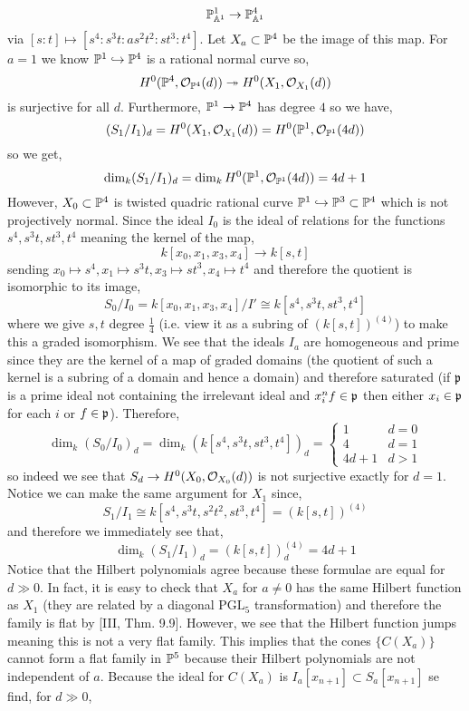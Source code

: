 \documentclass[12pt]{article}
\begin{document}
\begin{enumerate}
\[ \P^1_{\A^1} \to \P^4_{\A^1} \]
via $[s:t] \mapsto [s^4 : s^3 t : a s^2 t^2 : s t^3 : t^4]$. Let $X_a \subset \P^4$ be the image of this map. For $a = 1$ we know $\P^1 \embed \P^4$ is a rational normal curve so,
\[ H^0(\P^4, \struct{\P^4}(d)) \onto H^0(X_1, \struct{X_1}(d)) \]
is surjective for all $d$. Furthermore, $\P^1 \to \P^4$ has degree $4$ so we have,
\[ (S_1/I_1)_d =  H^0(X_1, \struct{X_1}(d)) = H^0(\P^1, \struct{\P^1}(4d)) \]
so we get,
\[ \dim_{k}(S_1/I_1)_d = \dim_{k} H^0(\P^1, \struct{\P^1}(4d)) = 4d + 1 \]
However, $X_0 \subset \P^4$ is twisted quadric rational curve $\P^1 \embed \P^3 \subset \P^4$ which is not projectively normal. Since the ideal $I_0$ is the ideal of relations for the functions $s^4, s^3 t, s t^3, t^4$ meaning the kernel of the map,
\[ k[x_0, x_1, x_3, x_4] \to k[s,t] \]
sending $x_0 \mapsto s^4, x_1 \mapsto s^3 t, x_3 \mapsto s t^3, x_4 \mapsto t^4$ and therefore the quotient is isomorphic to its image,
\[ S_0/I_0 = k[x_0, x_1, x_3, x_4]/I' \cong k[s^4, s^3 t, s t^3, t^4] \] 
where we give $s,t$ degree $\frac{1}{4}$ (i.e. view it as a subring of $(k[s,t])^{(4)}$) to make this a graded isomorphism. We see that the ideals $I_a$ are homogeneous and prime since they are the kernel of a map of graded domains (the quotient of such a kernel is a subring of a domain and hence a domain) and therefore saturated (if $\p$ is a prime ideal not containing the irrelevant ideal and $x_i^{n} f \in \p$ then either $x_i \in \p$ for each $i$ or $f \in \p$). Therefore,
\[ \dim_{k} (S_0 / I_0)_d = \dim_k (k[s^4, s^3 t, s t^3, t^4])_d = 
\begin{cases}
1 & d = 0
\\
4 & d = 1
\\
4 d + 1 & d > 1
\end{cases} \]
so indeed we see that $S_d \to H^0(X_0, \struct{X_0}(d))$ is not surjective exactly for $d = 1$. Notice we can make the same argument for $X_1$ since,
\[ S_1 / I_1 \cong k[s^4, s^3 t, s^2 t^2, s t^3, t^4] = (k[s,t])^{(4)} \]
and therefore we immediately see that,
\[ \dim_k (S_1 / I_1)_d = (k[s,t])^{(4)}_d = 4d + 1 \]
Notice that the Hilbert polynomials agree because these formulae are equal for $d \gg 0$. In fact, it is easy to check that $X_a$ for $a \neq 0$ has the same Hilbert function as $X_1$ (they are related by a diagonal $\mathrm{PGL}_5$ transformation) and therefore the family is flat by [III, Thm. 9.9]. However, we see that the Hilbert function jumps meaning this is not a very flat family. This implies that the cones $\{ C(X_a) \}$ cannot form a flat family in $\P^5$ because their Hilbert polynomials are not independent of $a$. Because the ideal for $C(X_a)$ is $I_a[x_{n+1}] \subset S_a[x_{n+1}]$ se find, for $d \gg 0$,

\end{enumerate}
\end{document}
